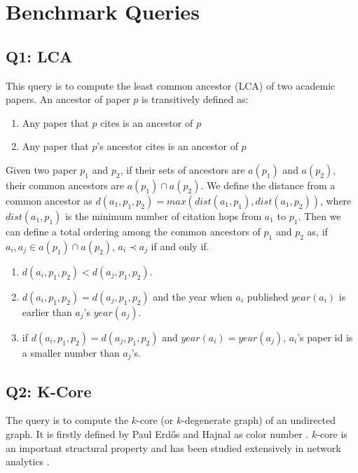\section{Benchmark Queries}


\subsection{Q1: LCA}
This query is to compute the least common ancestor (LCA) of two 
academic papers. An ancestor of paper $p$ is transitively defined as:

\begin{enumerate}
    \item Any paper that $p$ cites is an ancestor of $p$
    \item Any paper that $p$'s ancestor cites is an ancestor of $p$
\end{enumerate} 

Given two paper $p_1$ and $p_2$, if their sets of ancestors are 
$a(p_1)$ and $a(p_2)$, their common ancestors are 
$a(p_1) \cap a(p_2)$. We define the distance from a common ancestor
as $d(a_1, p_1, p_2) = max(dist(a_1, p_1), dist(a_1, p_2))$, where 
$dist(a_1, p_1)$ is the minimum number of citation hops from $a_1$ to 
$p_1$. Then we can define a total ordering among the common ancestors
of $p_1$ and $p_2$ as, if $a_i, a_j \in a(p_1) \cap a(p_2)$, 
$a_i \prec a_j$ if and only if.

\begin{enumerate}
    \item $d(a_i, p_1, p_2) < d(a_j, p_1, p_2)$.
    \item $d(a_i, p_1, p_2) = d(a_j, p_1, p_2)$ and the year when $a_i$
    published $year(a_i)$ is earlier than $a_j$'s $year(a_j)$.
    \item if $d(a_i, p_1, p_2) = d(a_j, p_1, p_2)$ and $year(a_i) = year(a_j)$, $a_i$'s paper id is a smaller number than $a_j$'s.
\end{enumerate}

\subsection{Q2: K-Core}

The query is to compute the $k$-core (or $k$-degenerate graph) 
of an undirected graph. It is firstly defined by Paul Erd\H{o}s 
and Hajnal as color number \cite{ErdosH66}. 
$k$-core is an important structural property
and has been studied extensively in network analytics 
\cite{Alvarez-HamelinDBV05NIPS, ChengKCO11ICDE}.

